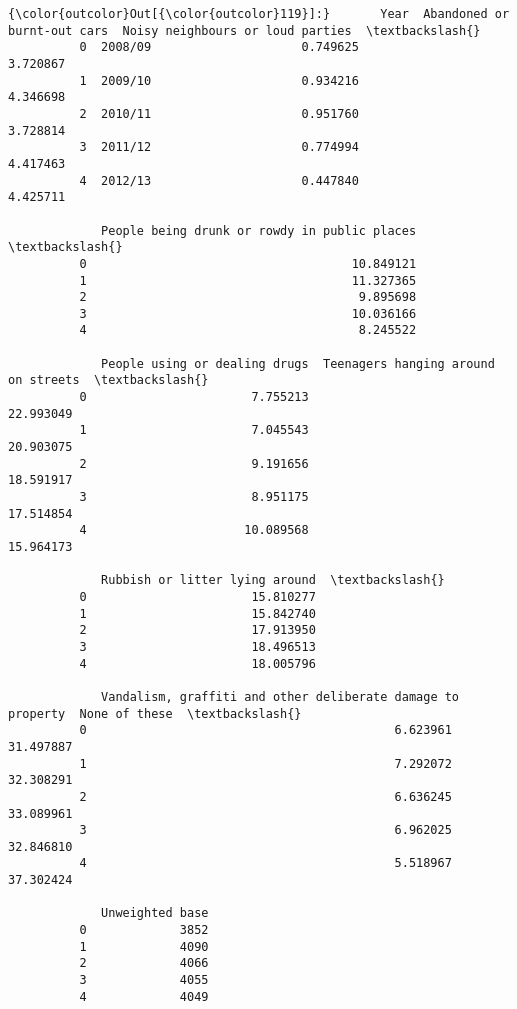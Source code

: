 \documentclass[11pt]{article}
\begin{document}
\begin{Verbatim}[commandchars=\\\{\}]
{\color{outcolor}Out[{\color{outcolor}119}]:}       Year  Abandoned or burnt-out cars  Noisy neighbours or loud parties  \textbackslash{}
          0  2008/09                     0.749625                          3.720867   
          1  2009/10                     0.934216                          4.346698   
          2  2010/11                     0.951760                          3.728814   
          3  2011/12                     0.774994                          4.417463   
          4  2012/13                     0.447840                          4.425711   
          
             People being drunk or rowdy in public places  \textbackslash{}
          0                                     10.849121   
          1                                     11.327365   
          2                                      9.895698   
          3                                     10.036166   
          4                                      8.245522   
          
             People using or dealing drugs  Teenagers hanging around on streets  \textbackslash{}
          0                       7.755213                            22.993049   
          1                       7.045543                            20.903075   
          2                       9.191656                            18.591917   
          3                       8.951175                            17.514854   
          4                      10.089568                            15.964173   
          
             Rubbish or litter lying around  \textbackslash{}
          0                       15.810277   
          1                       15.842740   
          2                       17.913950   
          3                       18.496513   
          4                       18.005796   
          
             Vandalism, graffiti and other deliberate damage to property  None of these  \textbackslash{}
          0                                           6.623961                31.497887   
          1                                           7.292072                32.308291   
          2                                           6.636245                33.089961   
          3                                           6.962025                32.846810   
          4                                           5.518967                37.302424   
          
             Unweighted base  
          0             3852  
          1             4090  
          2             4066  
          3             4055  
          4             4049  
\end{Verbatim}
            
\end{document}

